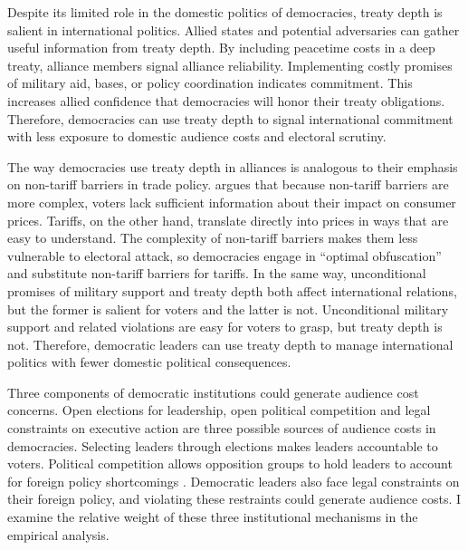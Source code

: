 \documentclass[12pt]{article}
\begin{document}
Despite its limited role in the domestic politics of democracies, treaty depth is salient in international politics.
Allied states and potential adversaries can gather useful information from treaty depth. 
By including peacetime costs in a deep treaty, alliance members signal alliance reliability. 
Implementing costly promises of military aid, bases, or policy coordination indicates commitment. 
This increases allied confidence that democracies will honor their treaty obligations. 
Therefore, democracies can use treaty depth to signal international commitment with less exposure to domestic audience costs and electoral scrutiny. 


The way democracies use treaty depth in alliances is analogous to their emphasis on non-tariff barriers in trade policy.
\citet{Kono2006} argues that because non-tariff barriers are more complex, voters lack sufficient information about their impact on consumer prices.
Tariffs, on the other hand, translate directly into prices in ways that are easy to understand.
The complexity of non-tariff barriers makes them less vulnerable to electoral attack, so democracies engage in ``optimal obfuscation'' and substitute non-tariff barriers for tariffs. 
In the same way, unconditional promises of military support and treaty depth both affect international relations, but the former is salient for voters and the latter is not. 
Unconditional military support and related violations are easy for voters to grasp, but treaty depth is not. 
Therefore, democratic leaders can use treaty depth to manage international politics with fewer domestic political consequences.


Three components of democratic institutions could generate audience cost concerns. 
Open elections for leadership, open political competition and legal constraints on executive action are three possible sources of audience costs in democracies. 
Selecting leaders through elections makes leaders accountable to voters. 
Political competition allows opposition groups to hold leaders to account for foreign policy shortcomings \citep{PotterBaum2014}. 
Democratic leaders also face legal constraints on their foreign policy, and violating these restraints could generate audience costs. 
I examine the relative weight of these three institutional mechanisms in the empirical analysis.  
\end{document}
